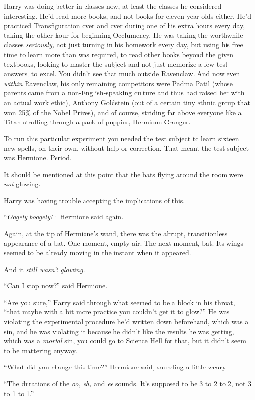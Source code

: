 Harry was doing better in classes now, at least the classes he
considered interesting. He'd read more books, and not books for
eleven-year-olds either. He'd practiced Transfiguration over and over
during one of his extra hours every day, taking the other hour for
beginning Occlumency. He was taking the worthwhile classes
\emph{seriously,} not just turning in his homework every day, but using
his free time to learn more than was required, to read other books
beyond the given textbooks, looking to master the subject and not just
memorize a few test answers, to excel. You didn't see that much outside
Ravenclaw. And now even \emph{within} Ravenclaw, his only remaining
competitors were Padma Patil (whose parents came from a
non-English-speaking culture and thus had raised her with an actual work
ethic), Anthony Goldstein (out of a certain tiny ethnic group that won
25\% of the Nobel Prizes), and of course, striding far above everyone
like a Titan strolling through a pack of puppies, Hermione Granger.

To run this particular experiment you needed the test subject to learn
sixteen new spells, on their own, without help or correction. That meant
the test subject was Hermione. Period.

It should be mentioned at this point that the bats flying around the
room were \emph{not} glowing.

Harry was having trouble accepting the implications of this.

``\emph{Oogely boogely!} '' Hermione said again.

Again, at the tip of Hermione's wand, there was the abrupt,
transitionless appearance of a bat. One moment, empty air. The next
moment, bat. Its wings seemed to be already moving in the instant when
it appeared.

And it \emph{still wasn't glowing.}

``Can I stop now?'' said Hermione.

``Are you sure,'' Harry said through what seemed to be a block in his
throat, ``that maybe with a bit more practice you couldn't get it to
glow?'' He was violating the experimental procedure he'd written down
beforehand, which was a sin, and he was violating it because he didn't
like the results he was getting, which was a \emph{mortal} sin, you
could go to Science Hell for that, but it didn't seem to be mattering
anyway.

``What did you change this time?'' Hermione said, sounding a little
weary.

``The durations of the \emph{oo,} \emph{eh,} and \emph{ee} sounds. It's
supposed to be 3 to 2 to 2, not 3 to 1 to 1.''

